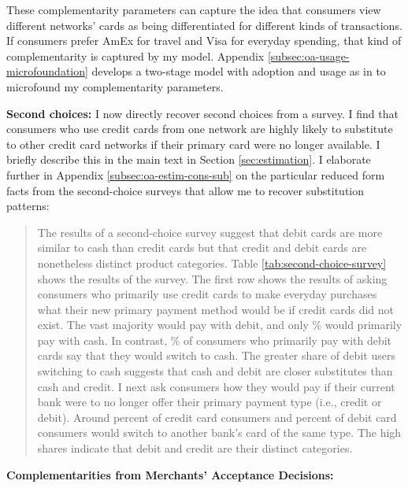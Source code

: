 \documentclass[main.tex]{subfiles}
\begin{document}
\begin{refsection}
These complementarity parameters can capture the idea that consumers view different networks' cards as being differentiated for different kinds of transactions.
If consumers prefer AmEx for travel and Visa for everyday spending, that kind of complementarity is captured by my model.
Appendix \ref{subsec:oa-usage-microfoundation} develops a two-stage model with adoption and usage as in \textcite{Koulayev.etal2016} to microfound my complementarity parameters.

\textbf{Second choices: } I now directly recover second choices from a survey.
I find that consumers who use credit cards from one network are highly likely to substitute to other credit card networks if their primary card were no longer available.
I briefly describe this in the main text in Section \ref{sec:estimation}.
I elaborate further in Appendix \ref{subsec:oa-estim-cons-sub} on the particular reduced form facts from the second-choice surveys that allow me to recover substitution patterns:

\begin{quotation}
    The results of a second-choice survey suggest that debit cards are more similar to cash than credit cards but that credit and debit cards are nonetheless distinct product categories.
Table \ref{tab:second-choice-survey} shows the results of the survey.
The first row shows the results of asking consumers who primarily use credit cards to make everyday purchases what their new primary payment method would be if credit cards did not exist.
The vast majority would pay with debit, and only \% would primarily pay with cash.
In contrast, \% of consumers who primarily pay with debit cards say that they would switch to cash.
The greater share of debit users switching to cash suggests that cash and debit are closer substitutes than cash and credit.
I next ask consumers how they would pay if their current bank were to no longer offer their primary payment type (i.e., credit or debit).
Around  percent of credit card consumers and  percent of debit card consumers would switch to another bank's card of the same type.
The high shares indicate that debit and credit are their distinct categories.
\end{quotation}

\textbf{Complementarities from Merchants' Acceptance Decisions: } \replycomplement


\end{refsection}
\end{document}
